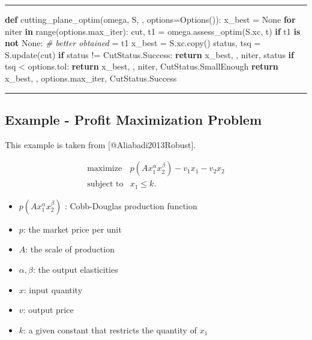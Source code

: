 \documentclass[
]{article}
\newenvironment{Shaded}{}{}
\newcommand{\BuiltInTok}[1]{\textcolor[rgb]{0.00,0.50,0.00}{#1}}
\newcommand{\CommentTok}[1]{\textcolor[rgb]{0.38,0.63,0.69}{\textit{#1}}}
\newcommand{\ControlFlowTok}[1]{\textcolor[rgb]{0.00,0.44,0.13}{\textbf{#1}}}
\newcommand{\KeywordTok}[1]{\textcolor[rgb]{0.00,0.44,0.13}{\textbf{#1}}}
\newcommand{\NormalTok}[1]{#1}
\newcommand{\OperatorTok}[1]{\textcolor[rgb]{0.40,0.40,0.40}{#1}}
\newcommand{\VariableTok}[1]{\textcolor[rgb]{0.10,0.09,0.49}{#1}}
\providecommand{\tightlist}{%
  \setlength{\itemsep}{0pt}\setlength{\parskip}{0pt}}
\begin{document}
\begin{center}\rule{0.5\linewidth}{0.5pt}\end{center}

\begin{Shaded}
\begin{Highlighting}[]
\KeywordTok{def}\NormalTok{ cutting\_plane\_optim(omega, S, \gamma, options}\OperatorTok{=}\NormalTok{Options()):}
\NormalTok{    x\_best }\OperatorTok{=} \VariableTok{None}
    \ControlFlowTok{for}\NormalTok{ niter }\KeywordTok{in} \BuiltInTok{range}\NormalTok{(options.max\_iter):}
\NormalTok{        cut, t1 }\OperatorTok{=}\NormalTok{ omega.assess\_optim(S.xc, t)}
        \ControlFlowTok{if}\NormalTok{ t1 }\KeywordTok{is} \KeywordTok{not} \VariableTok{None}\NormalTok{:  }\CommentTok{\# better \gamma obtained}
\NormalTok{            \gamma }\OperatorTok{=}\NormalTok{ t1}
\NormalTok{            x\_best }\OperatorTok{=}\NormalTok{ S.xc.copy()}
\NormalTok{        status, tsq }\OperatorTok{=}\NormalTok{ S.update(cut)}
        \ControlFlowTok{if}\NormalTok{ status }\OperatorTok{!=}\NormalTok{ CutStatus.Success:}
            \ControlFlowTok{return}\NormalTok{ x\_best, \gamma, niter, status}
        \ControlFlowTok{if}\NormalTok{ tsq }\OperatorTok{\textless{}}\NormalTok{ options.tol:}
            \ControlFlowTok{return}\NormalTok{ x\_best, \gamma, niter, CutStatus.SmallEnough}
    \ControlFlowTok{return}\NormalTok{ x\_best, \gamma, options.max\_iter, CutStatus.Success}
\end{Highlighting}
\end{Shaded}

\begin{center}\rule{0.5\linewidth}{0.5pt}\end{center}

\subsection{Example - Profit Maximization
Problem}\label{example---profit-maximization-problem}

This example is taken from {[}@Aliabadi2013Robust{]}.

\[\begin{array}{ll}
   \text{maximize} & p(A x_1^\alpha x_2^\beta) - v_1 x_1 - v_2 x_2 \\
   \text{subject to}& x_1 \le k.
\end{array}\]

\begin{itemize}
\tightlist
\item
  \(p(A x_1^\alpha x_2^\beta)\) : Cobb-Douglas production function
\item
  \(p\): the market price per unit
\item
  \(A\): the scale of production
\item
  \(\alpha, \beta\): the output elasticities
\item
  \(x\): input quantity
\item
  \(v\): output price
\item
  \(k\): a given constant that restricts the quantity of \(x_1\)
\end{itemize}
\end{document}
